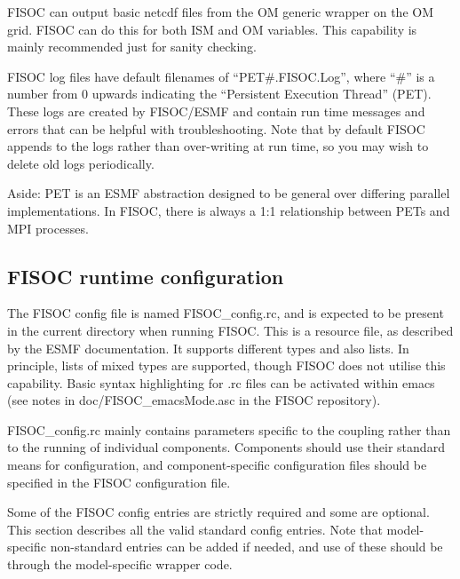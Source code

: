 \documentclass[11pt]{article}
\begin{document}
FISOC can output basic netcdf files from the OM generic wrapper 
on the OM grid. 
FISOC can do this for both ISM and OM variables.
This capability is mainly recommended just for sanity checking.


FISOC log files have default filenames of ``PET\#.FISOC.Log'', where ``\#'' is a number from 0 upwards 
indicating the ``Persistent Execution Thread'' (PET). 
These logs are created by FISOC/ESMF and contain run time messages and errors that can 
be helpful with troubleshooting.
Note that by default FISOC appends to the logs rather than over-writing at run time, so you may wish to delete 
old logs periodically. 

Aside: PET is an ESMF abstraction designed to be general over differing parallel implementations. 
In FISOC, there is always a 1:1 relationship between PETs and MPI processes. 






\subsection{FISOC runtime configuration}
\label{sec:config}

The FISOC config file is named FISOC\_config.rc, and is expected to be present 
in the current directory when running FISOC.  
This is a resource file, as described by the 
ESMF documentation.  It supports different types and also lists. 
In principle, lists of mixed types are supported, though FISOC does not utilise this capability.
Basic syntax highlighting for .rc files can be activated within emacs 
(see notes in doc/FISOC\_emacsMode.asc in the FISOC repository).

FISOC\_config.rc mainly contains parameters specific to the coupling rather than to the running of 
individual components.  
Components should use their standard means for configuration, and component-specific configuration files 
should be specified in the FISOC configuration file.

Some of the FISOC config entries are strictly required and some are optional.
This section describes all the valid standard config entries. 
Note that model-specific non-standard entries can be added if needed, and use of these 
should be through the model-specific wrapper code.
\end{document}
